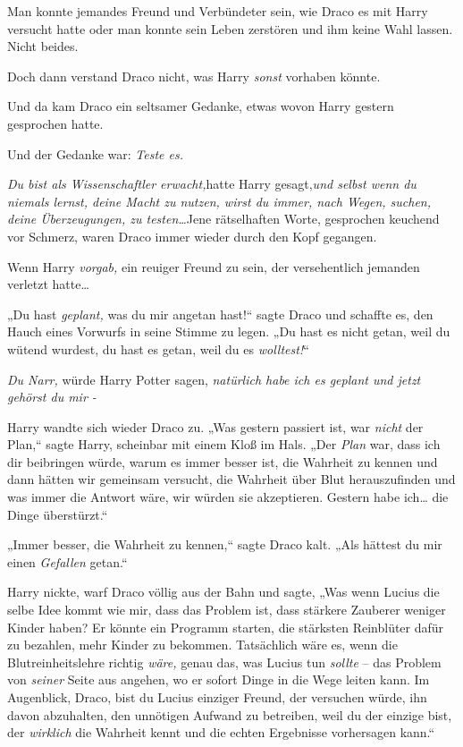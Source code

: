 {Man konnte jemandes Freund und Verbündeter sein, wie Draco es mit Harry versucht hatte oder man konnte sein Leben zerstören und ihm keine Wahl lassen. Nicht beides.

Doch dann verstand Draco nicht, was Harry \emph{sonst} vorhaben könnte.

Und da kam Draco ein seltsamer Gedanke, etwas wovon Harry gestern gesprochen hatte.

Und der Gedanke war: \emph{Teste es.}

\emph{Du bist als Wissenschaftler erwacht,}hatte Harry gesagt,\emph{und selbst wenn du niemals lernst, deine Macht zu nutzen, wirst du immer, nach Wegen, suchen, deine Überzeugungen, zu testen…}Jene rätselhaften Worte, gesprochen keuchend vor Schmerz, waren Draco immer wieder durch den Kopf gegangen.

Wenn Harry \emph{vorgab,} ein reuiger Freund zu sein, der versehentlich jemanden verletzt hatte…

„Du hast \emph{geplant,} was du mir angetan hast!“ sagte Draco und schaffte es, den Hauch eines Vorwurfs in seine Stimme zu legen. „Du hast es nicht getan, weil du wütend wurdest, du hast es getan, weil du es \emph{wolltest!}“

\emph{Du Narr,} würde Harry Potter sagen, \emph{natürlich habe ich es geplant und jetzt gehörst du mir -}

Harry wandte sich wieder Draco zu. „Was gestern passiert ist, war \emph{nicht} der Plan,“ sagte Harry, scheinbar mit einem Kloß im Hals. „Der \emph{Plan} war, dass ich dir beibringen würde, warum es immer besser ist, die Wahrheit zu kennen und dann hätten wir gemeinsam versucht, die Wahrheit über Blut herauszufinden und was immer die Antwort wäre, wir würden sie akzeptieren. Gestern habe ich… die Dinge überstürzt.“

„Immer besser, die Wahrheit zu kennen,“ sagte Draco kalt. „Als hättest du mir einen \emph{Gefallen} getan.“

Harry nickte, warf Draco völlig aus der Bahn und sagte, „Was wenn Lucius die selbe Idee kommt wie mir, dass das Problem ist, dass stärkere Zauberer weniger Kinder haben? Er könnte ein Programm starten, die stärksten Reinblüter dafür zu bezahlen, mehr Kinder zu bekommen. Tatsächlich wäre es, wenn die Blutreinheitslehre richtig \emph{wäre,} genau das, was Lucius tun \emph{sollte} -- das Problem von \emph{seiner} Seite aus angehen, wo er sofort Dinge in die Wege leiten kann. Im Augenblick, Draco, bist du Lucius einziger Freund, der versuchen würde, ihn davon abzuhalten, den unnötigen Aufwand zu betreiben, weil du der einzige bist, der \emph{wirklich} die Wahrheit kennt und die echten Ergebnisse vorhersagen kann.“

}
